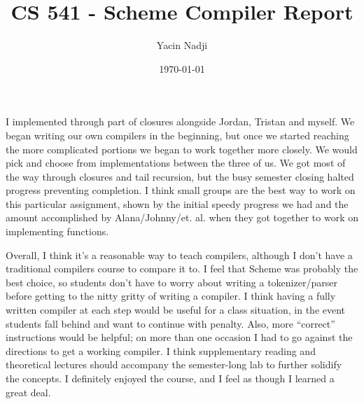 \documentclass{article}
\title{CS 541 - Scheme Compiler Report}
\author{Yacin Nadji}
\date{\today}
\begin{document}
\maketitle

I implemented through part of closures alongside Jordan, Tristan and myself. We began writing our own compilers in the beginning, but once we started reaching the more complicated portions we began to work together more closely. We would pick and choose from implementations between the three of us. We got most of the way through closures and tail recursion, but the busy semester closing halted progress preventing completion. I think small groups are the best way to work on this particular assignment, shown by the initial speedy progress we had and the amount accomplished by Alana/Johnny/et. al. when they got together to work on implementing functions.

Overall, I think it's a reasonable way to teach compilers, although I don't have a traditional compilers course to compare it to. I feel that Scheme was probably the best choice, so students don't have to worry about writing a tokenizer/parser before getting to the nitty gritty of writing a compiler. I think having a fully written compiler at each step would be useful for a class situation, in the event students fall behind and want to continue with penalty. Also, more ``correct'' instructions would be helpful; on more than one occasion I had to go against the directions to get a working compiler. I think supplementary reading and theoretical lectures should accompany the semester-long lab to further solidify the concepts. I definitely enjoyed the course, and I feel as though I learned a great deal.
\end{document}
